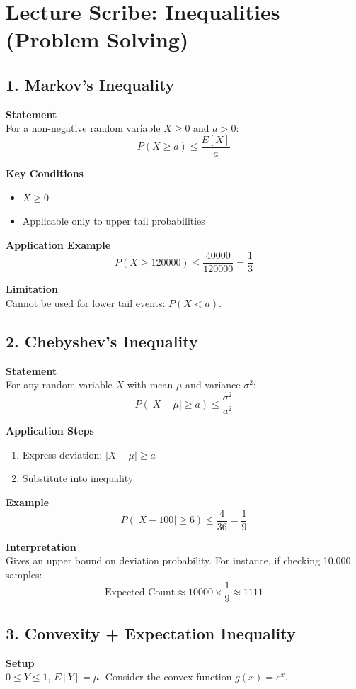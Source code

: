 \documentclass{article}
\begin{document}
\section*{Lecture Scribe: Inequalities (Problem Solving)}

\subsection*{1. Markov’s Inequality}
\textbf{Statement} \\
For a non-negative random variable $X \ge 0$ and $a > 0$:
\[ P(X \ge a) \le \frac{E[X]}{a} \]

\textbf{Key Conditions}
\begin{itemize}
    \item $X \ge 0$
    \item Applicable only to upper tail probabilities
\end{itemize}

\textbf{Application Example}
\[ P(X \ge 120000) \le \frac{40000}{120000} = \frac{1}{3} \]

\textbf{Limitation} \\
Cannot be used for lower tail events: $P(X < a)$.

\subsection*{2. Chebyshev’s Inequality}
\textbf{Statement} \\
For any random variable $X$ with mean $\mu$ and variance $\sigma^2$:
\[ P(|X - \mu| \ge a) \le \frac{\sigma^2}{a^2} \]

\textbf{Application Steps}
\begin{enumerate}
    \item Express deviation: $|X - \mu| \ge a$
    \item Substitute into inequality
\end{enumerate}

\textbf{Example}
\[ P(|X - 100| \ge 6) \le \frac{4}{36} = \frac{1}{9} \]

\textbf{Interpretation} \\
Gives an upper bound on deviation probability. For instance, if checking 10,000 samples:
\[ \text{Expected Count} \approx 10000 \times \frac{1}{9} \approx 1111 \]

\subsection*{3. Convexity + Expectation Inequality}
\textbf{Setup} \\
$0 \le Y \le 1$, $E[Y] = \mu$. Consider the convex function $g(x) = e^x$.
\end{document}
